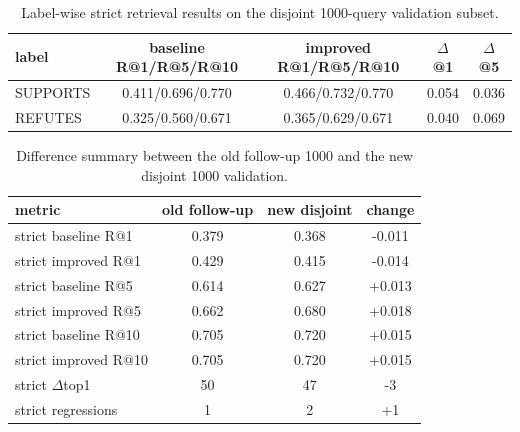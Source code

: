 \begin{table}[t]
\centering
\caption{Label-wise strict retrieval results on the disjoint 1000-query validation subset.}
\begin{tabular}{lcccc}
\hline
label & baseline R@1/R@5/R@10 & improved R@1/R@5/R@10 & $\Delta$@1 & $\Delta$@5 \\
\hline
SUPPORTS & 0.411/0.696/0.770 & 0.466/0.732/0.770 & 0.054 & 0.036 \\
REFUTES & 0.325/0.560/0.671 & 0.365/0.629/0.671 & 0.040 & 0.069 \\
\hline
\end{tabular}
\end{table}

\begin{table}[t]
\centering
\caption{Difference summary between the old follow-up 1000 and the new disjoint 1000 validation.}
\begin{tabular}{lccc}
\hline
metric & old follow-up & new disjoint & change \\
\hline
strict baseline R@1 & 0.379 & 0.368 & -0.011 \\
strict improved R@1 & 0.429 & 0.415 & -0.014 \\
strict baseline R@5 & 0.614 & 0.627 & +0.013 \\
strict improved R@5 & 0.662 & 0.680 & +0.018 \\
strict baseline R@10 & 0.705 & 0.720 & +0.015 \\
strict improved R@10 & 0.705 & 0.720 & +0.015 \\
strict $\Delta$top1 & 50 & 47 & -3 \\
strict regressions & 1 & 2 & +1 \\
\hline
\end{tabular}
\end{table}
